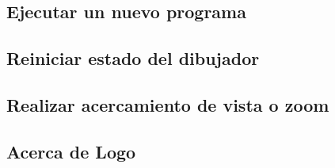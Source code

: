 \subsection{Ejecutar un nuevo programa}

\subsection{Reiniciar estado del dibujador}

\subsection{Realizar acercamiento de vista o zoom}

\subsection{Acerca de Logo}
